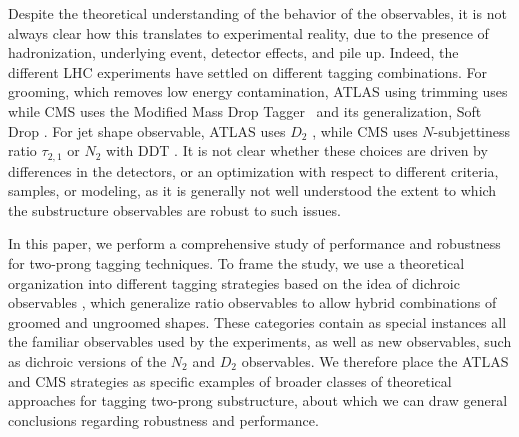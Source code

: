 \documentclass[11pt,letterpaper]{article}
\begin{document}
Despite the
theoretical understanding of the behavior of the observables, it is
not always clear how this translates to experimental reality, due to
the presence of hadronization, underlying event, detector effects, and
pile up.
%
Indeed, the different LHC experiments have settled on different
tagging combinations.
%
For grooming, which removes low energy
contamination,  ATLAS using trimming \cite{Krohn:2009th} uses while CMS uses the Modified
  Mass Drop Tagger~\cite{Dasgupta:2013ihk} and its generalization, Soft Drop \cite{Larkoski:2014wba}.
  For jet shape observable, ATLAS uses $D_2$ \cite{Larkoski:2014gra,Larkoski:2015kga}, while CMS uses $N$-subjettiness ratio $\tau_{2,1}$ \cite{Thaler:2010tr,Thaler:2011gf} or $N_2$ \cite{Moult:2016cvt} with DDT \cite{Dolen:2016kst}.
  It is not clear whether these choices are driven by differences in the detectors, or an optimization with respect to different criteria, samples, or modeling, as it is generally not well understood the extent to which the substructure observables are robust to such issues.

In this paper, we perform a comprehensive study of performance and robustness for two-prong tagging techniques.
%
To frame the study, we use a theoretical organization into different tagging strategies based on the idea of dichroic observables \cite{Salam:2016yht}, which generalize ratio observables to allow hybrid combinations of groomed and ungroomed shapes.
 These categories contain as special instances all the familiar observables used by the experiments, as well as new observables, such as dichroic versions of the $N_2$ and $D_2$ observables.
 We therefore place the ATLAS and CMS strategies as specific examples of broader classes of theoretical approaches for tagging two-prong substructure, about which we can draw general conclusions regarding robustness and performance.
\end{document}
